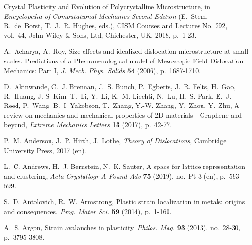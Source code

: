 \documentclass[CRPHYS,Unicode,manuscript]{cedram}
\begin{document}
%
\def\bysame{\leavevmode ---------\thinspace}
\makeatletter\if@francais\providecommand{\og}{<<~}\providecommand{\fg}{~>>}
\else\gdef{}\gdef{}\fi\makeatother
\def\cdrandname{\&}
\providecommand\cdrnumero{no.~}
\providecommand{\cdredsname}{eds.}
\providecommand{\cdredname}{ed.}
\providecommand{\cdrchapname}{chap.}
\providecommand{\cdrmastersthesisname}{Memoir}
\providecommand{\cdrphdthesisname}{PhD Thesis}
\begin{thebibliography}{100}

{\og Crystal Plasticity and Evolution of Polycrystalline Microstructure\fg}, in
  \emph{Encyclopedia of Computational Mechanics Second Edition} (E.~Stein,
  R.~de~Borst, T.~J.~R. Hughes, \cdredsname), CISM Courses and Lectures No.
  292, vol.~44, John Wiley \& Sons, Ltd, Chichester, UK, 2018, p.~1-23.

A.~Acharya, A.~Roy, {\og Size effects and idealized dislocation microstructure
  at small scales: Predictions of a Phenomenological model of Mesoscopic Field
  Dislocation Mechanics: Part {I}\fg}, \emph{J. Mech. Phys. Solids} \textbf{54}
  (2006), p.~1687-1710.

D.~Akinwande, C.~J. Brennan, J.~S. Bunch, P.~Egberts, J.~R. Felts, H.~Gao,
  R.~Huang, J.-S. Kim, T.~Li, Y.~Li, K.~M. Liechti, N.~Lu, H.~S. Park, E.~J.
  Reed, P.~Wang, B.~I. Yakobson, T.~Zhang, Y.-W. Zhang, Y.~Zhou, Y.~Zhu, {\og A
  review on mechanics and mechanical properties of {2D} materials---Graphene
  and beyond\fg}, \emph{Extreme Mechanics Letters} \textbf{13} (2017),
  p.~42-77.

P.~M. Anderson, J.~P. Hirth, J.~Lothe, \emph{Theory of Dislocations}, Cambridge
  University Press, 2017 (en).

L.~C. Andrews, H.~J. Bernstein, N.~K. Sauter, {\og A space for lattice
  representation and clustering\fg}, \emph{Acta Crystallogr A Found Adv}
  \textbf{75} (2019), \cdrnumero Pt 3 (en), p.~593-599.

S.~D. Antolovich, R.~W. Armstrong, {\og Plastic strain localization in metals:
  origins and consequences\fg}, \emph{Prog. Mater Sci.} \textbf{59} (2014),
  p.~1-160.

A.~S. Argon, {\og Strain avalanches in plasticity\fg}, \emph{Philos. Mag.}
  \textbf{93} (2013), \cdrnumero 28-30, p.~3795-3808.


\end{thebibliography}
\end{document}
